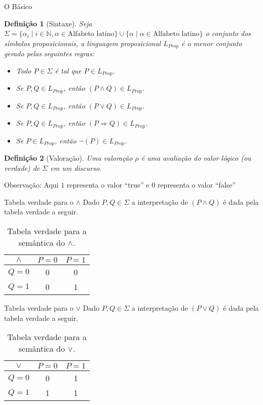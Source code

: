 \documentclass[aspectratio=169]{beamer}
\newtheorem{defi}{Definição}
\begin{document}
	\begin{frame}{O Básico}
		\begin{defi}[Sintaxe]
			Seja $\Sigma = \{\alpha_i \mid i \in \mathbb{N}, \alpha \in \text{Alfabeto latino} \} \cup  \{\alpha \mid \alpha \in \text{Alfabeto latino} \}$ o conjunto dos símbolos proposicionais, a linguagem proposicional $L_{Prop}$ é o menor conjunto gerado pelas seguintes regras:
			\begin{itemize}
				\item Todo $P \in \Sigma$ é tal que $P \in L_{Prop}$.
				\item Se $P, Q \in L_{Prop}$, então $(P \land Q) \in L_{Prop}$.
				\item Se $P, Q \in L_{Prop}$, então $(P \lor Q) \in L_{Prop}$.
				\item Se $P, Q \in L_{Prop}$, então $(P \Rightarrow Q) \in L_{Prop}$.
				\item Se $P \in L_{Prop}$, então $\neg(P) \in L_{Prop}$.
			\end{itemize}
		\end{defi}
		\begin{defi}[Valoração]
			Uma valoração $\rho$ é uma avaliação do valor lógico (ou verdade) de $\Sigma$ em um discurso.
		\end{defi}
		\pause
		{\color{red}Observação}: Aqui $1$ representa o valor ``true'' e 0 representa o valor ``false''
	\end{frame}

	\begin{frame}{Tabela verdade para o $\land$}
		Dado $P, Q \in \Sigma$ a interpretação de $(P \land Q)$ é dada pela tabela verdade a seguir.
		\begin{table}[h]
			\centering
			\begin{tabular}{c|c|c}
				\hline
				$\land$ & $P = 0$ & $P = 1$ \\
				\hline
				$Q = 0$ & 0 &  0\\ 
				$Q = 1$ & 0 &  1\\
				\hline
			\end{tabular}
			\caption{Tabela verdade para a semântica do $\land$.}
			\label{tab:And}
		\end{table}
	\end{frame}

	\begin{frame}{Tabela verdade para o $\lor$}
		Dado $P, Q \in \Sigma$ a interpretação de $(P \lor Q)$ é dada pela tabela verdade a seguir.
		\begin{table}[h]
			\centering
			\begin{tabular}{c|c|c}
				\hline
				$\lor$ & $P = 0$ & $P = 1$ \\
				\hline
				$Q = 0$ & 0 &  1\\ 
				$Q = 1$ & 1 &  1\\
				\hline
			\end{tabular}
			\caption{Tabela verdade para a semântica do $\lor$.}
			\label{tab:Or}
		\end{table}
	\end{frame}
\end{document}
